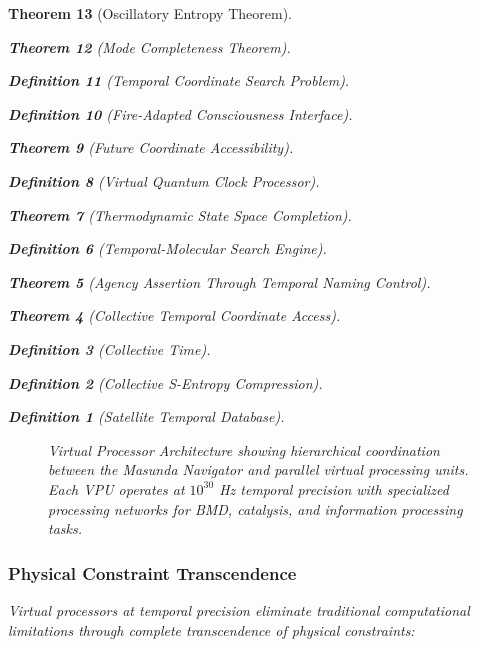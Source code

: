 \documentclass[12pt,a4paper]{article}
\newtheorem{theorem}{Theorem}[section]
\newtheorem{definition}[theorem]{Definition}
\begin{document}
\begin{theorem}[Oscillatory Entropy Theorem]
\begin{theorem}[Mode Completeness Theorem]
\begin{enumerate}
\begin{definition}[Temporal Coordinate Search Problem]
\begin{algorithm}
\begin{definition}[Fire-Adapted Consciousness Interface]
\begin{theorem}[Future Coordinate Accessibility]
\begin{definition}[Virtual Quantum Clock Processor]
\begin{itemize}
\begin{itemize}
\begin{theorem}[Thermodynamic State Space Completion]
\begin{definition}[Temporal-Molecular Search Engine]
\begin{theorem}[Agency Assertion Through Temporal Naming Control]
\begin{remark}
\begin{theorem}[Collective Temporal Coordinate Access]
\begin{definition}[Collective Time]
\begin{definition}[Collective S-Entropy Compression]
\begin{definition}[Satellite Temporal Database]
\begin{algorithm}
\begin{table}[h]
{\begin{figure}[h]
\caption{Virtual Processor Architecture showing hierarchical coordination between the Masunda Navigator and parallel virtual processing units. Each VPU operates at $10^{30}$ Hz temporal precision with specialized processing networks for BMD, catalysis, and information processing tasks.}
\label{fig:virtual_processor_architecture}
\end{figure}

\subsubsection{Physical Constraint Transcendence}

Virtual processors at temporal precision eliminate traditional computational limitations through complete transcendence of physical constraints:

\begin{figure}[h]
\centering
\begin{tikzpicture}[
    node distance=2cm,
    constraint/.style={rectangle, draw, text width=3cm, text centered, minimum height=1cm},
    arrow/.style={thick,->,>=stealth}
]


\end{tikzpicture}
\end{figure}}
\end{table}
\end{algorithm}
\end{definition}
\end{definition}
\end{definition}
\end{theorem}
\end{remark}
\end{theorem}
\end{definition}
\end{theorem}
\end{itemize}
\end{itemize}
\end{definition}
\end{theorem}
\end{definition}
\end{algorithm}
\end{definition}
\end{enumerate}
\end{theorem}
\end{theorem}
\end{document}
